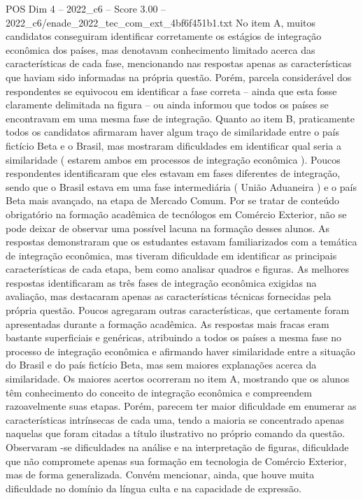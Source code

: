 \begin{textsample}{POS Dim 4 – 2022\_c6 – Score 3.00 – 2022\_c6/enade\_2022\_tec\_com\_ext\_4bf6f451b1.txt}
No item A, muitos candidatos conseguiram identificar corretamente os estágios de integração econômica dos países, mas denotavam conhecimento limitado acerca das características de cada fase, mencionando nas respostas apenas as características que haviam sido informadas na própria questão.
Porém, parcela considerável dos respondentes se equivocou em identificar a fase correta – ainda que esta fosse claramente delimitada na figura – ou ainda informou que todos os países se encontravam em uma mesma fase de integração.
Quanto ao item B, praticamente todos os candidatos afirmaram haver algum traço de similaridade entre o país fictício Beta e o Brasil, mas mostraram dificuldades em identificar qual seria a similaridade ( estarem ambos em processos de integração econômica ).
Poucos respondentes identificaram que eles estavam em fases diferentes de integração, sendo que o Brasil estava em uma fase intermediária ( União Aduaneira ) e o país Beta mais avançado, na etapa de Mercado Comum.
Por se tratar de conteúdo obrigatório na formação acadêmica de tecnólogos em Comércio Exterior, não se pode deixar de observar uma possível lacuna na formação desses alunos.
As respostas demonstraram que os estudantes estavam familiarizados com a temática de integração econômica, mas tiveram dificuldade em identificar as principais características de cada etapa, bem como analisar quadros e figuras.
As melhores respostas identificaram as três fases de integração econômica exigidas na avaliação, mas destacaram apenas as características técnicas fornecidas pela própria questão.
Poucos agregaram outras características, que certamente foram apresentadas durante a formação acadêmica.
As respostas mais fracas eram bastante superficiais e genéricas, atribuindo a todos os países a mesma fase no processo de integração econômica e afirmando haver similaridade entre a situação do Brasil e do país fictício Beta, mas sem maiores explanações acerca da similaridade.
Os maiores acertos ocorreram no item A, mostrando que os alunos têm conhecimento do conceito de integração econômica e compreendem razoavelmente suas etapas.
Porém, parecem ter maior dificuldade em enumerar as características intrínsecas de cada uma, tendo a maioria se concentrado apenas naquelas que foram citadas a título ilustrativo no próprio comando da questão.
Observaram -se dificuldades na análise e na interpretação de figuras, dificuldade que não compromete apenas sua formação em tecnologia de Comércio Exterior, mas de forma generalizada.
Convém mencionar, ainda, que houve muita dificuldade no domínio da língua culta e na capacidade de expressão.

\end{textsample}
